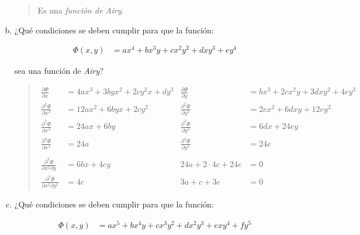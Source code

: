 \documentclass[a4paper,10pt,twoside,final,spanish]{article}
\begin{document}
\begin{enumerate}[a.]
\begin{quote}
\begin{minipage}{0.5\linewidth}
\begin{tcolorbox}[colback=gray!10!white,colframe=black!0!white]
Es una \textit{función de Airy}.

\end{tcolorbox}

\end{minipage}

\end{quote}

\item ¿Qué condiciones se deben cumplir para que la función:

\begin{align*}
\Phi(x,y) &= ax^{4}+bx^{3}y+cx^{2}y^{2}+dxy^{3}+ey^{4}
\end{align*}

sea una función de \textit{Airy}?

\begin{quote}

\begin{tcolorbox}[colback=gray!10!white,colframe=black!0!white]

\begin{align*}
\frac{\partial\Phi}{\partial x} &= 4ax^{3}+3byx^{2}+2cy^{2}x+dy^{3} 
& \frac{\partial\Phi}{\partial y} &= bx^{3}+2cx^{2}y+3dxy^{2}+4ey^{3} \\
\frac{\partial^{2}\Phi}{\partial x^{2}} &= 12ax^{2}+6byx+2cy^{2} 
& \frac{\partial^{2}\Phi}{\partial y^{2}} &= 2cx^{2}+6dxy+12ey^{2} \\
\frac{\partial^{3}\Phi}{\partial x^{3}} &= 24ax+6by
& \frac{\partial^{3}\Phi}{\partial y^{3}} &= 6dx+24ey \\
\frac{\partial^{4}\Phi}{\partial x^{4}} &= 24a
& \frac{\partial^{4}\Phi}{\partial y^{4}} &= 24e \\ \\
\frac{\partial^{3}\Phi}{\partial x^{2}\partial y} &= 6bx+4cy 
& 24a+2\cdot 4c+24e &= 0\\
\frac{\partial^{4}\Phi}{\partial x^{2}\partial y^{2}} &= 4c 
& 3a+c+3e &= 0
\end{align*}

\end{tcolorbox}

\end{quote}

\item ¿Qué condiciones se deben cumplir para que la función:

\begin{align*}
\Phi(x,y) &= ax^{5}+bx^{4}y+cx^{3}y^{2}+dx^{2}y^{3}+exy^{4}+fy^{5}
\end{align*}


\end{enumerate}
\end{document}
